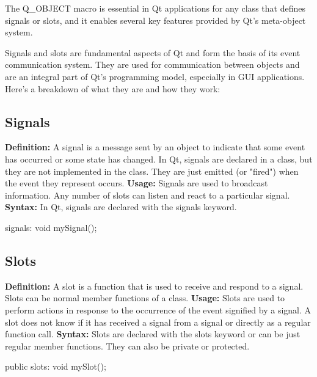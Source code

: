 \documentclass{report}
\begin{document}
    \pagebreak
    \bigbreak \noindent 
    The Q\_OBJECT macro is essential in Qt applications for any class that defines signals or slots, and it enables several key features provided by Qt's meta-object system.

    \bigbreak \noindent 
    \bigbreak \noindent 
    Signals and slots are fundamental aspects of Qt and form the basis of its event communication system. They are used for communication between objects and are an integral part of Qt's programming model, especially in GUI applications. Here's a breakdown of what they are and how they work:
    \bigbreak \noindent 
    \subsection{Signals}
    \bigbreak \noindent 
    \textbf{Definition:} A signal is a message sent by an object to indicate that some event has occurred or some state has changed. In Qt, signals are declared in a class, but they are not implemented in the class. They are just emitted (or "fired") when the event they represent occurs.
    \bigbreak \noindent 
    \textbf{Usage:} Signals are used to broadcast information. Any number of slots can listen and react to a particular signal.
    \bigbreak \noindent 
    \textbf{Syntax:} In Qt, signals are declared with the signals keyword.
    \bigbreak \noindent 
    \begin{cppcode}
signals:
    void mySignal();
    \end{cppcode}

    \bigbreak \noindent 
    \subsection{Slots}
    \bigbreak \noindent 
    \textbf{Definition:} A slot is a function that is used to receive and respond to a signal. Slots can be normal member functions of a class.
    \bigbreak \noindent 
    \textbf{Usage:} Slots are used to perform actions in response to the occurrence of the event signified by a signal. A slot does not know if it has received a signal from a signal or directly as a regular function call.
    \bigbreak \noindent 
    \textbf{Syntax:} Slots are declared with the slots keyword or can be just regular member functions. They can also be private or protected.
    \bigbreak \noindent 
    \begin{cppcode}
public slots:
    void mySlot();
    \end{cppcode}
\end{document}
